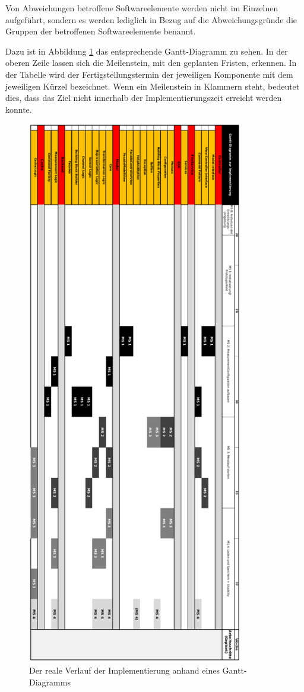 \documentclass[parskip=full]{scrartcl}
\begin{document}
Von Abweichungen betroffene Softwareelemente werden nicht im Einzelnen aufgeführt, sondern es werden lediglich in Bezug auf die Abweichungsgründe die Gruppen der betroffenen Softwareelemente benannt.

Dazu ist in Abbildung \ref{reale} das entsprechende Gantt-Diagramm zu sehen. In der oberen Zeile lassen sich die Meilenstein, mit den geplanten Fristen, erkennen. In der Tabelle wird  der Fertigstellungstermin der jeweiligen Komponente mit dem jeweiligen Kürzel bezeichnet. Wenn ein Meilenstein in Klammern steht, bedeutet dies, dass das Ziel nicht innerhalb der Implementierungszeit erreicht werden konnte.

\clearpage

\begin{figure}[htbp]
    \begin{center}
        \includegraphics[height = 24cm]{Grafiken/Realer_Ablauf_der_Implementierung.pdf}
        \caption{Der reale Verlauf der Implementierung anhand eines Gantt-Diagramms}
        \label{reale}
    \end{center}
\end{figure}
\end{document}
